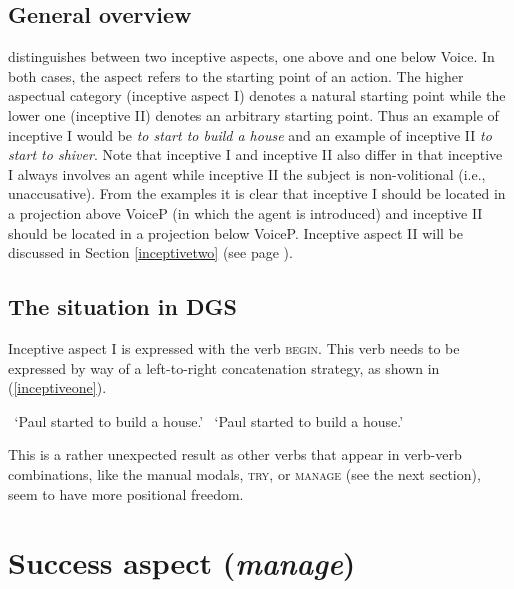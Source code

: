 \subsection{General overview}
\citet{cinque1999adverbs, cinque2006restructuring} distinguishes between two inceptive aspects, one above and one below Voice. In both cases, the aspect refers to the starting point of an action. The higher aspectual category (inceptive aspect I) denotes a natural starting point while the lower one (inceptive II) denotes an arbitrary starting point. Thus an example of inceptive I would be \textit{to start to build a house} and an example of inceptive II \textit{to start to shiver}. Note that inceptive I and inceptive II also differ in that inceptive I always involves an agent while inceptive II the subject is non-volitional (i.e., unaccusative). From the examples it is clear that inceptive I should be located in a projection above VoiceP (in which the agent is introduced) and inceptive II should be located in a projection below VoiceP. Inceptive aspect II will be discussed in Section \ref{inceptivetwo} (see page \pageref{inceptivetwo}).

\subsection{The situation in DGS}
Inceptive aspect I is expressed with the verb \textsc{begin}. This verb needs to be expressed by way of a left-to-right concatenation strategy, as shown in (\ref{inceptiveone}).

\begin{exe}
\ex  \label{inceptiveone}\begin{xlist} 
\glt \textcolor{white}{?}`Paul started to build a house.' \label{ex:inceptiveonea}
\glt \textcolor{white}{?}`Paul started to build a house.' \label{ex:inceptiveoneb}
\end{xlist}
\end{exe} 

\noindent This is a rather unexpected result as other verbs that appear in verb-verb combinations, like the manual modals, \textsc{try}, or \textsc{manage} (see the next section), seem to have more positional freedom.

\section{Success aspect (\textit{manage})}
